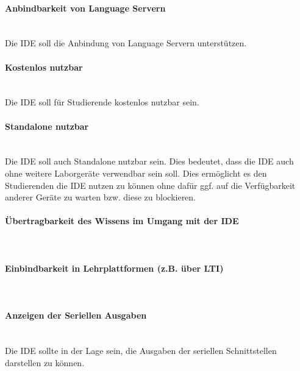\paragraph{Anbindbarkeit von Language Servern} \mbox{} \\
Die IDE soll die Anbindung von Language Servern unterstützen.

\paragraph{Kostenlos nutzbar} \mbox{} \\
Die IDE soll für Studierende kostenlos nutzbar sein.

\paragraph{Standalone nutzbar} \mbox{} \\
Die IDE soll auch Standalone nutzbar sein. Dies bedeutet, dass die IDE auch ohne weitere Laborgeräte verwendbar sein soll. Dies ermöglicht es den Studierenden die IDE nutzen zu können ohne dafür ggf. auf die Verfügbarkeit anderer Geräte zu warten bzw. diese zu blockieren.

\paragraph{Übertragbarkeit des Wissens im Umgang mit der IDE} \mbox{} \\


\paragraph{Einbindbarkeit in Lehrplattformen (z.B. über LTI)} \mbox{} \\


\paragraph{Anzeigen der Seriellen Ausgaben} \mbox{} \\
Die IDE sollte in der Lage sein, die Ausgaben der seriellen Schnittstellen darstellen zu können.
